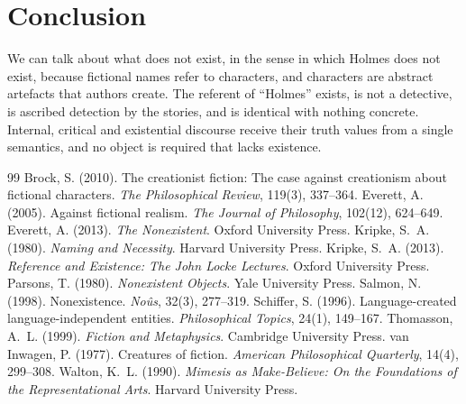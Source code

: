 \documentclass{situationist-preprint}
\begin{document}
\section{Conclusion}

We can talk about what does not exist, in the sense in which Holmes does not exist, because fictional names refer to characters, and characters are abstract artefacts that authors create. The referent of \enquote{Holmes} exists, is not a detective, is ascribed detection by the stories, and is identical with nothing concrete. Internal, critical and existential discourse receive their truth values from a single semantics, and no object is required that lacks existence.

\begin{thebibliography}{99}\small
{} Brock, S. (2010). The creationist fiction: The case against creationism about fictional characters. \emph{The Philosophical Review}, 119(3), 337--364.
 Everett, A. (2005). Against fictional realism. \emph{The Journal of Philosophy}, 102(12), 624--649.
 Everett, A. (2013). \emph{The Nonexistent}. Oxford University Press.
 Kripke, S.~A. (1980). \emph{Naming and Necessity}. Harvard University Press.
 Kripke, S.~A. (2013). \emph{Reference and Existence: The John Locke Lectures}. Oxford University Press.
 Parsons, T. (1980). \emph{Nonexistent Objects}. Yale University Press.
 Salmon, N. (1998). Nonexistence. \emph{No\^us}, 32(3), 277--319.
 Schiffer, S. (1996). Language-created language-independent entities. \emph{Philosophical Topics}, 24(1), 149--167.
 Thomasson, A.~L. (1999). \emph{Fiction and Metaphysics}. Cambridge University Press.
 van Inwagen, P. (1977). Creatures of fiction. \emph{American Philosophical Quarterly}, 14(4), 299--308.
 Walton, K.~L. (1990). \emph{Mimesis as Make-Believe: On the Foundations of the Representational Arts}. Harvard University Press.
\end{thebibliography}
\end{document}

